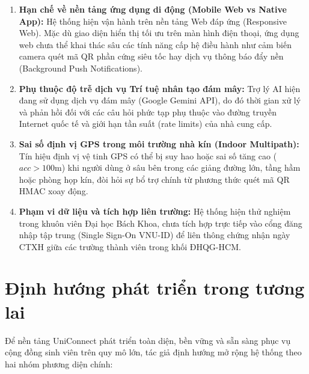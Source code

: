 \begin{enumerate}[leftmargin=*, noitemsep]
    \item \textbf{Hạn chế về nền tảng ứng dụng di động (Mobile Web vs Native App):} Hệ thống hiện vận hành trên nền tảng Web đáp ứng (Responsive Web). Mặc dù giao diện hiển thị tối ưu trên màn hình điện thoại, ứng dụng web chưa thể khai thác sâu các tính năng cấp hệ điều hành như cảm biến camera quét mã QR phần cứng siêu tốc hay dịch vụ thông báo đẩy nền (Background Push Notifications).
    \item \textbf{Phụ thuộc độ trễ dịch vụ Trí tuệ nhân tạo đám mây:} Trợ lý AI hiện đang sử dụng dịch vụ đám mây (Google Gemini API), do đó thời gian xử lý và phản hồi đối với các câu hỏi phức tạp phụ thuộc vào đường truyền Internet quốc tế và giới hạn tần suất (rate limits) của nhà cung cấp.
    \item \textbf{Sai số định vị GPS trong môi trường nhà kín (Indoor Multipath):} Tín hiệu định vị vệ tinh GPS có thể bị suy hao hoặc sai số tăng cao ($acc > 100$m) khi người dùng ở sâu bên trong các giảng đường lớn, tầng hầm hoặc phòng họp kín, đòi hỏi sự bổ trợ chính từ phương thức quét mã QR HMAC xoay động.
    \item \textbf{Phạm vi dữ liệu và tích hợp liên trường:} Hệ thống hiện thử nghiệm trong khuôn viên Đại học Bách Khoa, chưa tích hợp trực tiếp vào cổng đăng nhập tập trung (Single Sign-On VNU-ID) để liên thông chứng nhận ngày CTXH giữa các trường thành viên trong khối ĐHQG-HCM.
\end{enumerate}

\section{Định hướng phát triển trong tương lai}
Để nền tảng UniConnect phát triển toàn diện, bền vững và sẵn sàng phục vụ cộng đồng sinh viên trên quy mô lớn, tác giả định hướng mở rộng hệ thống theo hai nhóm phương diện chính:

